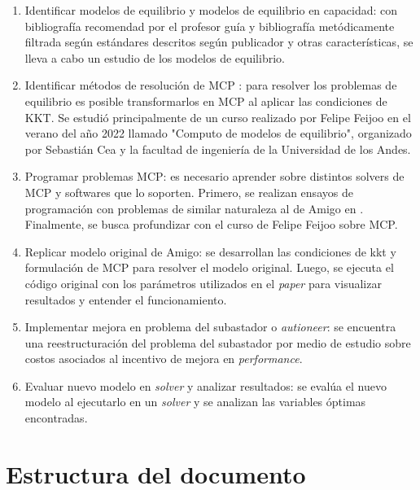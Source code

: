 \begin{enumerate}
\item Identificar modelos de equilibrio y modelos de equilibrio en capacidad: con bibliografía recomendad por el profesor guía y bibliografía metódicamente filtrada según estándares descritos según publicador y otras características, se lleva a cabo un estudio de los modelos de equilibrio.
\item Identificar métodos de resolución de MCP : para resolver los problemas de equilibrio es posible transformarlos en MCP al aplicar las condiciones de KKT. Se estudió principalmente de un curso realizado por Felipe Feijoo en el verano del año 2022 llamado "Computo de modelos de equilibrio", organizado por Sebastián Cea y la facultad de ingeniería de la Universidad de los Andes.   
\item Programar problemas MCP: es necesario aprender sobre distintos solvers de MCP y softwares que lo soporten. Primero, se realizan ensayos de programación con problemas de similar naturaleza al de Amigo en . Finalmente, se busca profundizar con el curso de Felipe Feijoo sobre MCP. 
\item Replicar modelo original de Amigo: se desarrollan las condiciones de kkt y formulación de MCP para resolver el modelo original. Luego, se ejecuta el código original con los parámetros utilizados en el \textit{paper} para visualizar resultados y entender el funcionamiento.
\item Implementar mejora en problema del subastador o \textit{autioneer}: se encuentra una reestructuración del problema del subastador por medio de estudio sobre costos asociados al incentivo de mejora en \textit{performance}.
\item Evaluar nuevo modelo en \textit{solver} y analizar resultados: se evalúa el nuevo modelo al ejecutarlo en un \textit{solver} y se analizan las variables óptimas encontradas.
\end{enumerate}


\section{Estructura del documento}





